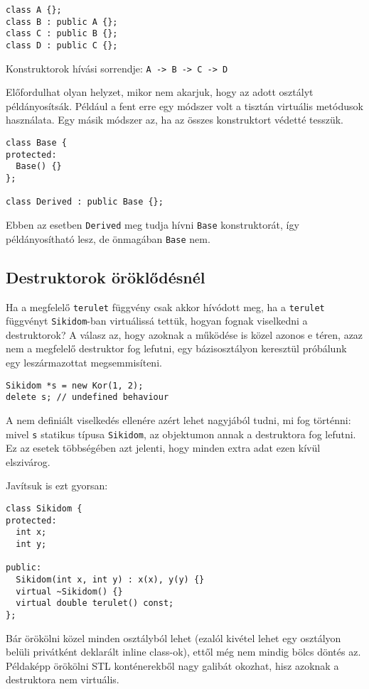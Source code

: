 \documentclass[../cpp_book/cpp_book.tex]{subfiles}
\begin{document}
	\begin{lstlisting}
class A {};
class B : public A {};
class C : public B {};
class D : public C {};
	\end{lstlisting}
	Konstruktorok hívási sorrendje: \texttt{A -> B -> C -> D}
	
	\medskip
	Előfordulhat olyan helyzet, mikor nem akarjuk, hogy az adott osztályt példányosítsák. Például a fent erre egy módszer volt a tisztán virtuális metódusok használata. Egy másik módszer az, ha az összes konstruktort védetté tesszük.
	\begin{lstlisting}
class Base {
protected:
  Base() {}
};

class Derived : public Base {};
	\end{lstlisting}
	Ebben az esetben \texttt{Derived} meg tudja hívni \texttt{Base} konstruktorát, így példányosítható lesz, de önmagában \texttt{Base} nem.
	\subsection{Destruktorok öröklődésnél}
	Ha a megfelelő \texttt{terulet} függvény csak akkor hívódott meg, ha a \texttt{terulet} függvényt \texttt{Sikidom}-ban virtuálissá tettük, hogyan fognak viselkedni a destruktorok? A válasz az, hogy azoknak a működése is közel azonos e téren, azaz nem a megfelelő destruktor fog lefutni, egy bázisosztályon keresztül próbálunk egy leszármazottat megsemmisíteni.
	\begin{lstlisting}
Sikidom *s = new Kor(1, 2);
delete s; // undefined behaviour
	\end{lstlisting}
	A nem definiált viselkedés ellenére azért lehet nagyjából tudni, mi fog történni: mivel \texttt{s} statikus típusa \texttt{Sikidom}, az objektumon annak a destruktora fog lefutni. Ez az esetek többségében azt jelenti, hogy minden extra adat ezen kívül elszivárog.
	
	Javítsuk is ezt gyorsan:
\begin{lstlisting}
class Sikidom {
protected:
  int x;
  int y;

public:
  Sikidom(int x, int y) : x(x), y(y) {}
  virtual ~Sikidom() {}
  virtual double terulet() const;
};
\end{lstlisting}
	Bár örökölni közel minden osztályból lehet (ezalól kivétel lehet egy osztályon belüli privátként deklarált inline class-ok), ettől még nem mindig bölcs döntés az. Példaképp örökölni STL konténerekből nagy galibát okozhat, hisz azoknak a destruktora nem virtuális.
	
\end{document}
